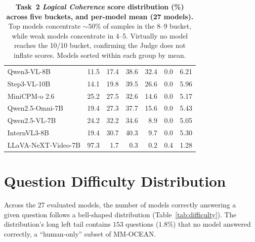 \documentclass{llmxive}
\providecommand{\benchname}{MM-OCEAN}
\begin{document}
\begin{table}[t]
{\begin{tabular}{lrrrrrr}
Qwen3-VL-8B          & 11.5 & 17.4 & 38.6 & 32.4 & 0.0 & 6.21 \\
Step3-VL-10B         & 14.1 & 19.8 & 39.5 & 26.6 & 0.0 & 5.96 \\
MiniCPM-o 2.6        & 25.2 & 27.5 & 32.6 & 14.6 & 0.0 & 5.17 \\
Qwen2.5-Omni-7B      & 19.4 & 27.3 & 37.7 & 15.6 & 0.0 & 5.43 \\
Qwen2.5-VL-7B        & 24.2 & 32.2 & 34.6 &  8.9 & 0.0 & 5.05 \\
InternVL3-8B         & 19.4 & 30.7 & 40.3 &  9.7 & 0.0 & 5.30 \\
LLaVA-NeXT-Video-7B  & 97.3 &  1.7 &  0.3 &  0.2 & 0.4 & 1.28 \\
\bottomrule
\end{tabular}%
}
\caption{\textbf{Task~2 \emph{Logical Coherence} score distribution (\%) across five buckets, and per-model mean (27 models).} Top models concentrate $\sim\!50\%$ of samples in the 8--9 bucket, while weak models concentrate in 4--5. Virtually no model reaches the 10/10 bucket, confirming the Judge does not inflate scores. Models sorted within each group by mean.}
\label{tab:t2_dist}
\end{table}

\section{Question Difficulty Distribution}
\label{app:difficulty}
Across the 27 evaluated models, the number of models correctly answering a given question follows a bell-shaped distribution (Table~\ref{tab:difficulty}). The distribution's long left tail contains $153$ questions ($1.8\%$) that no model answered correctly, a ``human-only'' subset of \benchname{}.
\end{document}
